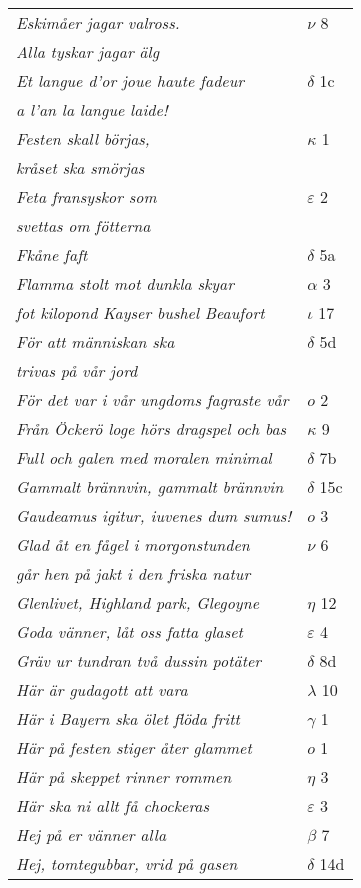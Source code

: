\documentclass[a6paper,10pt]{article}
\begin{document}
\newpage
\begin{table}[!h]
\begin{tabular}{l l}
\textit{Eskimåer jagar valross.}	&$\nu$ 8\\
\textit{Alla tyskar jagar älg} &\\
\textit{Et langue d'or joue haute fadeur}	&$\delta$ 1c\\
\textit{a l'an la langue laide!} &\\
\textit{Festen skall börjas,}	&$\kappa$ 1\\
\textit{kråset ska smörjas} &\\
\textit{Feta fransyskor som}	&$\varepsilon$ 2\\
\textit{svettas om fötterna} &\\
\textit{Fkåne faft}	&$\delta$ 5a\\
\textit{Flamma stolt mot dunkla skyar}	&$\alpha$ 3\\
\textit{fot kilopond Kayser bushel Beaufort}	&$\iota$ 17\\
\textit{För att människan ska}	&$\delta$ 5d\\
\textit{trivas på vår jord} &\\
\textit{För det var i vår ungdoms fagraste vår}	&$o$ 2\\
\textit{Från Öckerö loge hörs dragspel och bas}	&$\kappa$ 9\\
\textit{Full och galen med moralen minimal}	&$\delta$ 7b\\
\textit{Gammalt brännvin, gammalt brännvin}	&$\delta$ 15c\\
\textit{Gaudeamus igitur, iuvenes dum sumus!}	&$o$ 3\\
\textit{Glad åt en fågel i morgonstunden}	&$\nu$ 6\\
\textit{går hen på jakt i den friska natur} &\\
\textit{Glenlivet, Highland park, Glegoyne}	&$\eta$ 12\\
\textit{Goda vänner, låt oss fatta glaset}	&$\varepsilon$ 4\\
\textit{Gräv ur tundran två dussin potäter}	&$\delta$ 8d\\
\textit{Här är gudagott att vara}	&$\lambda$ 10\\
\textit{Här i Bayern ska ölet flöda fritt}	&$\gamma$ 1\\
\textit{Här på festen stiger åter glammet}	&$o$ 1\\
\textit{Här på skeppet rinner rommen}	&$\eta$ 3\\
\textit{Här ska ni allt få chockeras}	&$\varepsilon$ 3\\
\textit{Hej på er vänner alla}	&$\beta$ 7\\
\textit{Hej, tomtegubbar, vrid på gasen}	&$\delta$ 14d\\
\end{tabular}
\end{table}
\end{document}
